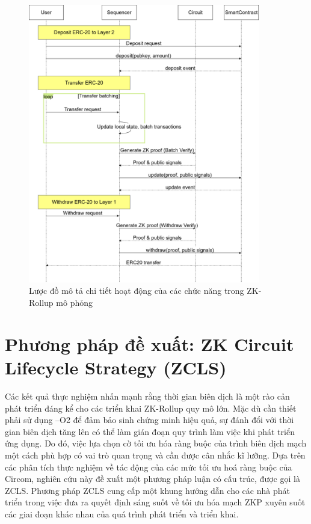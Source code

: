 \begin{figure}[h]
    \centering
    \includegraphics[width = 0.9\textwidth]{imgs/RollupBaseline.png}
    \caption{Lược đồ mô tả chi tiết hoạt động của các chức năng trong ZK-Rollup mô phỏng}
    \label{fig:chapter4-RollupBaseline}
\end{figure}
\clearpage
\section{Phương pháp đề xuất: ZK Circuit Lifecycle Strategy (ZCLS)}

Các kết quả thực nghiệm nhấn mạnh rằng thời gian biên dịch là một rào cản phát triển đáng kể cho các triển khai ZK-Rollup quy mô lớn. Mặc dù cần thiết phải sử dụng --O2 để đảm bảo sinh chứng minh hiệu quả, sự đánh đổi với thời gian biên dịch tăng lên có thể làm gián đoạn quy trình làm việc khi phát triển ứng dụng. Do đó, việc lựa chọn cờ tối ưu hóa ràng buộc của trình biên dịch mạch một cách phù hợp có vai trò quan trọng và cần được cân nhắc kĩ lưỡng. Dựa trên các phân tích thực nghiệm về tác động của các mức tối ưu hoá ràng buộc của Circom, nghiên cứu này đề xuất một phương pháp luận có cấu trúc, được gọi là ZCLS. Phương pháp ZCLS cung cấp một khung hướng dẫn cho các nhà phát triển trong việc đưa ra quyết định sáng suốt về tối ưu hóa mạch ZKP xuyên suốt các giai đoạn khác nhau của quá trình phát triển và triển khai.


